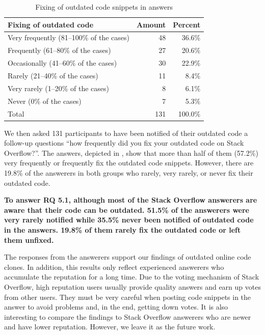 \documentclass[10pt,journal,compsoc]{IEEEtran}
\begin{document}
\begin{table}
	\centering
	\caption{Fixing of outdated code snippets in answers}
	\label{tab:survey_code_snippet_outdated_fix}
	\begin{tabular}{lrr}
		\toprule
		Fixing of outdated code & Amount & Percent \\
		\midrule
		Very frequently (81--100\% of the cases) & 48 & 36.6\% \\
		Frequently (61--80\% of the cases) & 27 & 20.6\% \\
		Occasionally (41--60\% of the cases) & 30 & 22.9\% \\
		Rarely (21--40\% of the cases) & 11 & 8.4\% \\
		Very rarely (1--20\% of the cases) & 8 & 6.1\% \\
		Never (0\% of the cases) & 7 & 5.3\% \\
		\midrule
		Total & 131 & 100.0\% \\
		\bottomrule
	\end{tabular}
\end{table}

We then asked 131 participants to have been notified of their outdated code a
follow-up questions ``how frequently did you fix your outdated code on Stack
Overflow?''. The answers, depicted in
, show that more than half of them
(57.2\%) very frequently or frequently fix the outdated code snippets. However,
there are 19.8\% of the answerers in both groups who rarely, very rarely, or never fix 
their outdated code.

\textbf{To answer RQ 5.1, although most of the Stack Overflow answerers are aware that their code
can be outdated. 51.5\% of the answerers were very rarely notified while 35.5\% never been notified of
outdated code in the answers. 19.8\% of them rarely fix the outdated code or left them unfixed.}

The responses from the answerers support our findings of outdated online code
clones. In addition, this
results only reflect experienced answerers who accumulate the reputation for a
long time. Due to the voting mechanism of Stack Overflow, high reputation users
usually provide quality answers and earn up votes from other users. They must be
very careful when posting code snippets in the answer to avoid problems and, in
the end, getting down votes. It is also interesting to compare the findings to
Stack Overflow answerers who are newer and have lower reputation. However, we
leave it as the future work.
\end{document}
